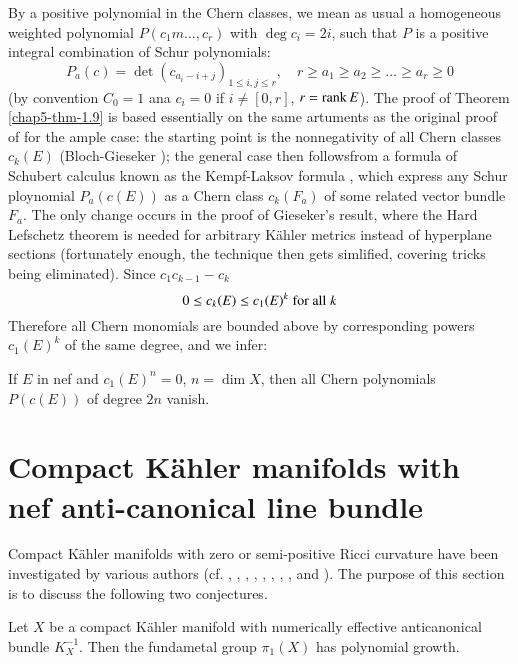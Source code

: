 By a positive polynomial in the Chern classes, we mean as usual a homogeneous weighted polynomial $P(c_{1}m \ldots, c_{r})$ with $\deg c_{i}= 2i$, such that $P$ is a positive integral combination of Schur polynomials:
$$
P_{a}(c)= \det (c_{a_{i}-i+j})_{1\leq i, j\leq r}, \quad r \geq a_{1} \geq a_{2} \geq \ldots \geq a_{r} \geq 0
$$
(by convention $C_{0}=1$ ana $c_{i} = 0$ if $i \neq [0,r]$, $r= \operatorname{rank} E$). The proof of Theorem \ref{chap5-thm-1.9} is based essentially on the same artuments as the original proof of \cite{chap5-keyFL83} for the ample case: the starting point is the nonnegativity of all Chern classes $c_{k}(E)$ (Bloch-Gieseker \cite{chap5-keyBG71}); the general case then follows\pageoriginale from a formula of Schubert calculus known as the Kempf-Laksov formula \cite{chap5-keyKL74}, which express any Schur ploynomial $P_{a}(c(E))$ as a Chern class $c_{k}(F_{a})$ of some related vector bundle $F_{a}$. The only change occurs in the proof of Gieseker's result, where the Hard Lefschetz theorem is needed for arbitrary K\"ahler metrics instead of hyperplane sections (fortunately enough, the technique then gets simlified, covering tricks being eliminated). Since $c_{1}c_{k-1}-c_{k}$
$$
0 \leq c_{k}(E) \leq c_{1} (E)^{k} \;\text{\rm for all}\; k
$$
Therefore all Chern monomials are bounded above by corresponding powers $c_{1}(E)^{k}$ of the same degree, and we infer:

\begin{seccoro}\label{chap5-coro-1.10}
If $E$ in nef and $c_{1}(E)^{n} =0$, $n= \dim X$, then all Chern polynomials $P(c(E))$ of degree $2n$ vanish.
\end{seccoro}

\section{Compact K\"ahler manifolds with nef anti-canoni\-cal line bundle}\label{chap5-sec-2}

 Compact K\"ahler manifolds with zero or semi-positive Ricci curvature have been investigated by various authors (cf. \cite{chap5-keyCa57}, \cite{chap5-keyKo61}, \cite{chap5-keyLi67}, \cite{chap5-keyLi71}, \cite{chap5-keyLi72},
  \cite{chap5-keyBo74a}, \cite{chap5-keyBo74b}, \cite{chap5-keyBe83}, \cite{chap5-keyKo81} and \cite{chap5-keyKr86}). The purpose of this section is to discuss the following two conjectures.

\begin{secconj}\label{chap5-conje-2.1}
Let $X$ be a compact K\"ahler manifold with numerically effective anticanonical bundle $K_{X}^{-1}$. Then the fundametal group $\pi_{1}(X)$ has polynomial growth.
\end{secconj}


